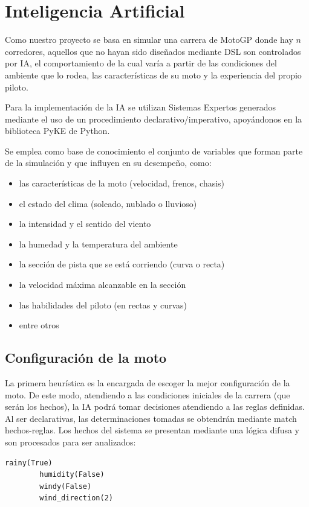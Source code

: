 \documentclass[12pt, letterpaper,spanish]{article}
\theoremstyle{definition}
\theoremstyle{remark}
\begin{document}
\section{Inteligencia Artificial}\cite{conferenciasIA}\cite{russell}
	Como nuestro proyecto se basa en simular una carrera de MotoGP donde hay $n$ corredores, aquellos que no hayan sido diseñados mediante DSL son controlados por IA, el comportamiento de la cual varía a partir de las condiciones del ambiente que lo rodea, las características de su moto y la experiencia del propio piloto.
	
	Para la implementación de la IA se utilizan Sistemas Expertos generados mediante el uso de un procedimiento declarativo/imperativo, apoyándonos en la biblioteca PyKE\cite{pyke} de Python.
	
	Se emplea como base de conocimiento el conjunto de variables que forman parte de la simulación y que influyen en su desempeño, como:
	\begin{itemize}
		\item las características de la moto (velocidad, frenos, chasis)
		\item el estado del clima (soleado, nublado o lluvioso)
		\item la intensidad y el sentido del viento
		\item la humedad y la temperatura del ambiente
		\item la sección de pista que se está corriendo (curva o recta)
		\item la velocidad máxima alcanzable en la sección
		\item las habilidades del piloto (en rectas y curvas)
		\item entre otros
	\end{itemize}
	
	\subsection{Configuración de la moto}
	La primera heurística es la encargada de escoger la mejor configuración de la moto. De este modo, atendiendo a las condiciones iniciales de la carrera (que serán los hechos), la IA podrá tomar decisiones atendiendo a las reglas definidas. Al ser declarativas, las determinaciones tomadas se obtendrán mediante match hechos-reglas.
	Los hechos del sistema se presentan mediante una lógica difusa y son procesados para ser analizados:
	\begin{lstlisting}[language={PySharp}, label={Script}]
		rainy(True)
		humidity(False)
		windy(False)
		wind_direction(2)
	\end{lstlisting}
	
\end{document}
